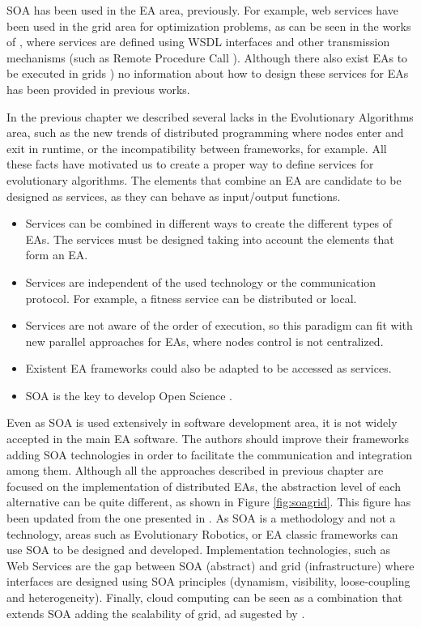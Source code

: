 \lettrine{S}OA has been used in the EA area, previously. For example, web services have been used in the grid area for optimization problems, as can be seen in the works of \cite{grid1,grid2,grid3,grid5}, where services are defined using WSDL interfaces and other transmission mechanisms (such as Remote Procedure Call \citep{grid6,grid7}). Although there also exist EAs to be executed in grids \citep{grid8,grid4,grid10}) no information about how to design these services for EAs has been provided in previous works. 

In the previous chapter we described several lacks in the Evolutionary Algorithms area, such as the new trends of distributed programming where nodes enter and exit in runtime, or the incompatibility between frameworks, for example. All these facts have motivated us to create a proper way to define services for evolutionary algorithms. The elements that combine an EA are candidate to be designed as services, as they can behave as input/output functions.  

\begin{itemize}
\item Services can be combined in different ways to create the different types of EAs. The services must be designed taking into account the elements that form an EA. 
\item Services are independent of the used technology or the communication protocol. For example, a fitness service can be distributed or local.
\item Services are not aware of the order of execution, so this paradigm can fit with new parallel approaches for EAs, where nodes control is not centralized. 
\item Existent EA frameworks could also be adapted to be accessed as services.
\item SOA is the key to develop Open Science \cite{Foster2005Science}.
\end{itemize}

Even as SOA is used extensively in software development area, it is not widely accepted in the main EA software. The authors should improve their frameworks adding SOA technologies in order to facilitate the communication and integration among them. Although all the approaches described in previous chapter are focused on the implementation of distributed EAs, the abstraction level of each alternative can be quite different, as shown in Figure \ref{fig:soagrid}. This figure has been updated from the one presented in \cite{SOALIB}. As SOA is a methodology and not a technology, areas such as Evolutionary Robotics, or EA classic frameworks can use SOA to be designed and developed. Implementation technologies, such as Web Services are the gap between SOA (abstract) and grid (infrastructure) where interfaces are designed using SOA principles (dynamism, visibility, loose-coupling and heterogeneity). Finally, cloud computing can be seen as a combination that extends SOA adding the scalability of grid, ad sugested by  \citep{SOALIB}.


